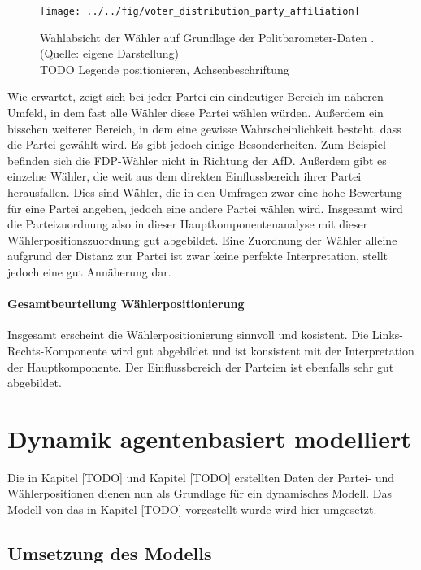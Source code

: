 \begin{figure}[htb]
	\centering
	\texttt{[image: ../../fig/voter\_distribution\_party\_affiliation]}
	\caption{Wahlabsicht der Wähler auf Grundlage der Politbarometer-Daten \citep{politbarometer}. (Quelle: eigene Darstellung)\\TODO Legende positionieren, Achsenbeschriftung}
	\label{fig:voter-positions-pca-party-affiliation}
\end{figure}

Wie erwartet, zeigt sich bei jeder Partei ein eindeutiger Bereich im näheren Umfeld, in dem fast alle Wähler diese Partei wählen würden. Außerdem ein bisschen weiterer Bereich, in dem eine gewisse Wahrscheinlichkeit besteht, dass die Partei gewählt wird. Es gibt jedoch einige Besonderheiten. Zum Beispiel befinden sich die FDP-Wähler nicht in Richtung der AfD. Außerdem gibt es einzelne Wähler, die weit aus dem direkten Einflussbereich ihrer Partei herausfallen. Dies sind Wähler, die in den Umfragen zwar eine hohe Bewertung für eine Partei angeben, jedoch eine andere Partei wählen wird.
Insgesamt wird die Parteizuordnung also in dieser Hauptkomponentenanalyse mit dieser Wählerpositionszuordnung gut abgebildet. Eine Zuordnung der Wähler alleine aufgrund der Distanz zur Partei ist zwar keine perfekte Interpretation, stellt jedoch eine gut Annäherung dar.

\paragraph{Gesamtbeurteilung Wählerpositionierung}
Insgesamt erscheint die Wählerpositionierung sinnvoll und kosistent. Die Links-Rechts-Komponente wird gut abgebildet und ist konsistent mit der Interpretation der Hauptkomponente. Der Einflussbereich der Parteien ist ebenfalls sehr gut abgebildet.

\section{Dynamik agentenbasiert modelliert} \label{Sec:Dynamik-Anwendung}

Die in Kapitel [TODO] und Kapitel [TODO] erstellten Daten der Partei- und Wählerpositionen dienen nun als Grundlage für ein dynamisches Modell. Das Modell von \citet{laver2005policy} das in Kapitel [TODO] vorgestellt wurde wird hier umgesetzt.

\subsection{Umsetzung des Modells}

